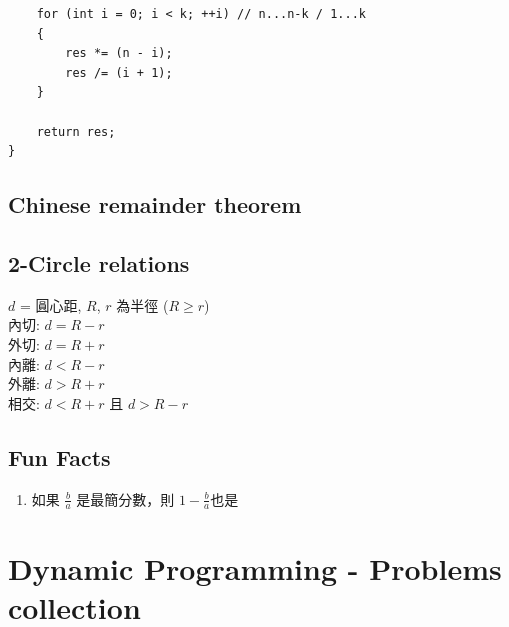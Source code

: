 \documentclass[10pt,oneside]{article}
\begin{document}
\begin{landscape}
\begin{multicols}{2}
\begin{verbatim}
    for (int i = 0; i < k; ++i) // n...n-k / 1...k
    {
        res *= (n - i);
        res /= (i + 1);
    }
 
    return res;
}
\end{verbatim}

\subsection{Chinese remainder theorem}

\subsection{2-Circle relations}

{\normalsize 
$d$ = 圓心距, $R$, $r$ 為半徑 ($R \geq r$)\\
內切: $d = R - r$\\
外切: $d = R + r$\\
內離: $d < R - r$\\
外離: $d > R + r$\\
相交: $d < R + r$ 且 $d > R - r$
}

\subsection{Fun Facts}

{\normalsize 
\begin{enumerate}
	\item 如果 $\frac b a$ 是最簡分數，則 $1 - \frac b a$也是%
\end{enumerate}
}


\section{Dynamic Programming - Problems collection}

% 

\end{multicols}
\end{landscape}
\end{document}

